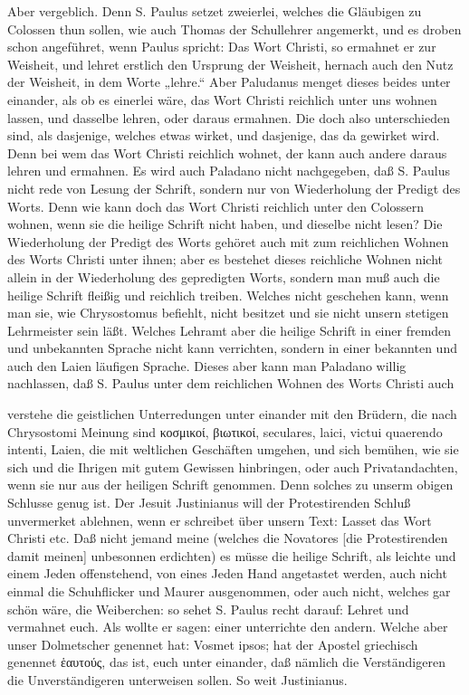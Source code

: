 Aber vergeblich. Denn S. Paulus setzet zweierlei, welches die Gläubigen zu Colossen thun sollen, wie auch Thomas der Schullehrer angemerkt, und es droben schon angeführet, wenn Paulus spricht: Das Wort Christi, so ermahnet er zur Weisheit, und lehret erstlich den Ursprung der Weisheit, hernach auch den Nutz der Weisheit, in dem Worte „lehre.“ Aber Paludanus menget dieses beides unter einander, als ob es einerlei wäre, das Wort Christi reichlich unter uns wohnen lassen, und dasselbe lehren, oder daraus ermahnen. Die doch also unterschieden sind, als dasjenige, welches etwas wirket, und dasjenige, das da gewirket wird. Denn bei wem das Wort Christi reichlich wohnet, der kann auch andere daraus lehren und ermahnen. Es wird auch Paladano nicht nachgegeben, daß S. Paulus nicht rede von Lesung der Schrift, sondern nur von Wiederholung der Predigt des Worts. Denn wie kann doch das Wort Christi reichlich unter den Colossern wohnen, wenn sie die heilige Schrift nicht haben, und dieselbe nicht lesen? Die Wiederholung der Predigt des Worts gehöret auch mit zum reichlichen Wohnen des Worts Christi unter ihnen; aber es bestehet dieses reichliche Wohnen nicht allein in der Wiederholung des gepredigten Worts, sondern man muß auch die heilige Schrift fleißig und reichlich treiben. Welches nicht geschehen kann, wenn man sie, wie Chrysostomus befiehlt, nicht besitzet und sie nicht unsern stetigen Lehrmeister sein läßt. Welches Lehramt aber die heilige Schrift in einer fremden und unbekannten Sprache nicht kann verrichten, sondern in einer bekannten und auch den Laien läufigen Sprache. Dieses aber kann man Paladano willig nachlassen, daß S. Paulus unter dem reichlichen Wohnen des Worts Christi auch


verstehe die geistlichen Unterredungen unter einander mit den Brüdern, die nach Chrysostomi Meinung sind κοσμικοί, βιωτικοί, seculares, laici, victui quaerendo intenti, Laien, die mit weltlichen Geschäften umgehen, und sich bemühen, wie sie sich und die Ihrigen mit gutem Gewissen hinbringen, oder auch Privatandachten, wenn sie nur aus der heiligen Schrift genommen. Denn solches zu unserm obigen Schlusse genug ist. Der Jesuit Justinianus will der Protestirenden Schluß unvermerket ablehnen, wenn er schreibet über unsern Text: Lasset das Wort Christi etc. Daß nicht jemand meine (welches die Novatores [die Protestirenden damit meinen] unbesonnen erdichten) es müsse die heilige Schrift, als leichte und einem Jeden offenstehend, von eines Jeden Hand angetastet werden, auch nicht einmal die Schuhflicker und Maurer ausgenommen, oder auch nicht, welches gar schön wäre, die Weiberchen: so sehet S. Paulus recht darauf: Lehret und vermahnet euch. Als wollte er sagen: einer unterrichte den andern. Welche aber unser Dolmetscher genennet hat: Vosmet ipsos; hat der Apostel griechisch genennet ἑαυτούς, das ist, euch unter einander, daß nämlich die Verständigeren die Unverständigeren unterweisen sollen. So weit Justinianus.

